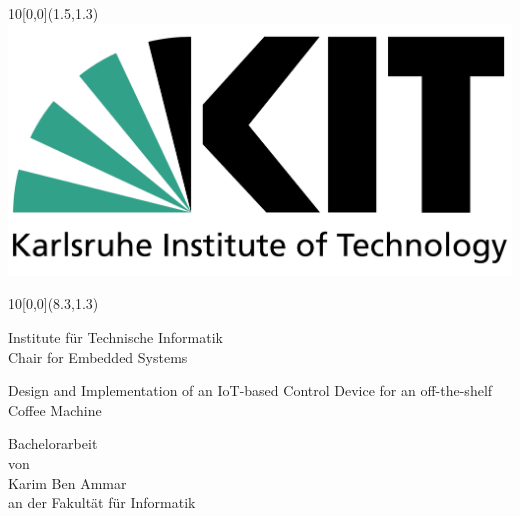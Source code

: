 
\newcommand{\changefont}[3]{\fontfamily{#1} \fontseries{#2} \fontshape{#3} \selectfont}

\newcommand{\diameter}{20}
\newcommand{\xone}{-60}
\newcommand{\xtwo}{440}
\newcommand{\yone}{60}
\newcommand{\ytwo}{-700}


\begin{titlepage}
\setlength{\oddsidemargin}{1cm}
\setlength{\topmargin}{-1cm}


\begin{textblock}{10}[0,0](1.5,1.3)
 \includegraphics[width=.3\textwidth]{KITlogo.pdf}
\end{textblock}
\begin{textblock}{10}[0,0](8.3,1.3)
\begin{flushleft}
\large Institute f\"{u}r Technische Informatik\\
Chair for Embedded Systems
  \end{flushleft}
\end{textblock}

\changefont{phv}{m}{n} %
\vspace*{3.5cm}
{
\centering
 \huge{Design and Implementation of an IoT-based Control Device for an off-the-shelf Coffee Machine}

 \vspace*{2cm}
 \large{Bachelorarbeit \\
   von
 }\\
 \vspace*{1cm}
 \Large{Karim Ben Ammar}\\
 \vspace*{1cm}
 \normalsize{
 an der Fakult\"{a}t f\"{u}r Informatik\\
 }

}
\end{titlepage}
